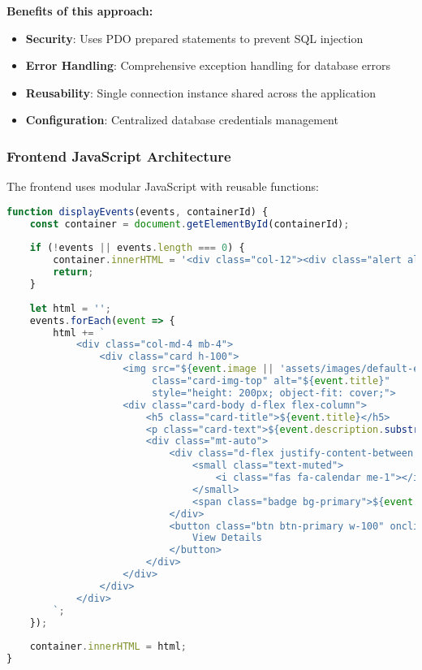 \documentclass[12pt,a4paper]{article}
\begin{document}
\textbf{Benefits of this approach:}
\begin{itemize}
    \item \textbf{Security}: Uses PDO prepared statements to prevent SQL injection
    \item \textbf{Error Handling}: Comprehensive exception handling for database errors
    \item \textbf{Reusability}: Single connection instance shared across the application
    \item \textbf{Configuration}: Centralized database credentials management
\end{itemize}

\subsubsection{Frontend JavaScript Architecture}
The frontend uses modular JavaScript with reusable functions:

\begin{lstlisting}[language=javascript, caption=Event Display Function]
function displayEvents(events, containerId) {
    const container = document.getElementById(containerId);
    
    if (!events || events.length === 0) {
        container.innerHTML = '<div class="col-12"><div class="alert alert-info">No events found.</div></div>';
        return;
    }
    
    let html = '';
    events.forEach(event => {
        html += `
            <div class="col-md-4 mb-4">
                <div class="card h-100">
                    <img src="${event.image || 'assets/images/default-event.jpg'}" 
                         class="card-img-top" alt="${event.title}" 
                         style="height: 200px; object-fit: cover;">
                    <div class="card-body d-flex flex-column">
                        <h5 class="card-title">${event.title}</h5>
                        <p class="card-text">${event.description.substring(0, 100)}...</p>
                        <div class="mt-auto">
                            <div class="d-flex justify-content-between align-items-center mb-2">
                                <small class="text-muted">
                                    <i class="fas fa-calendar me-1"></i>${event.formatted_date}
                                </small>
                                <span class="badge bg-primary">${event.price_formatted}</span>
                            </div>
                            <button class="btn btn-primary w-100" onclick="viewEvent(${event.id})">
                                View Details
                            </button>
                        </div>
                    </div>
                </div>
            </div>
        `;
    });
    
    container.innerHTML = html;
}
\end{lstlisting}
\end{document}
